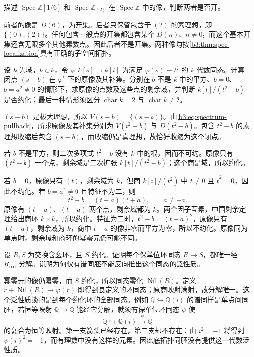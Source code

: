 \begin{exercise}\label{b3:ex:01-two-localizations}
	描述 \(\operatorname{Spec}\mathbb Z[1/6]\) 和 \(\operatorname{Spec}\mathbb Z_{(2)}\) 在 \(\operatorname{Spec}\mathbb Z\) 中的像，判断两者是否开。
\end{exercise}
\begin{solution}
	前者的像是 \(D(6)\)，为开集。后者只保留包含于 \((2)\) 的素理想，即 \(\bigl\{(0),(2)\bigr\}\)。任何包含一般点的开集都包含某个 \(D(n)\)、\(n\ne0\)，而这个基本开集还含无限多个其他素数点。因此后者不是开集。两种像均按\cref{b3:thm:spec-localization}具有正确的子空间拓扑。
\end{solution}

\begin{exercise}\label{b3:ex:01-square-map}
	设 \(k\) 为域，\(b\in k\)，令 \(\varphi:k[s]\rightarrow k[t]\) 为满足 \(\varphi(s)=t^2\) 的 \(k\)-代数同态。计算闭点 \((s-b)\) 在 \(\varphi^*\) 下的原像及其补集。分别在 \(b\) 不是 \(k\) 中的平方、\(b=0\)、\(b=a^2\ne0\) 的情形下，求原像的点数及这些点的剩余域，并判断 \(k[t]/(t^2-b)\) 是否约化；最后一种情形须区分 \(\operatorname{char}k=2\) 与 \(\operatorname{char}k\ne2\)。
\end{exercise}
\begin{solution}
	\((s-b)\) 是极大理想，所以 \(V(s-b)=\{(s-b)\}\)。由\eqref{b3:eq:spectrum-pullback}，所求原像及其补集分别为 \(V(t^2-b)\) 与 \(D(t^2-b)\)。包含 \(t^2-b\) 的素理想收缩后包含 \((s-b)\)，而收缩仍是真理想，故恰好收缩为这个闭点。

	若 \(b\) 不是平方，则二次多项式 \(t^2-b\) 没有 \(k\) 中的根，因而不可约。原像只有 \((t^2-b)\) 一个点，剩余域是二次扩张 \(k[t]/(t^2-b)\)；这个商是域，所以约化。

	若 \(b=0\)，原像只有 \((t)\)，剩余域为 \(k\)，但商 \(k[t]/(t^2)\) 中 \(\bar t\ne0\) 且 \(\bar t^2=0\)，因此不约化。若 \(b=a^2\ne0\) 且特征不为二，则
	\[
		t^2-b=(t-a)(t+a),\qquad a\ne-a.
	\]
	原像有 \((t-a)\)、\((t+a)\) 两个点，剩余域都为 \(k\)。两个因子互素，中国剩余定理给出商环 \(k\times k\)，所以约化。特征为二时，\(t^2-b=(t-a)^2\)，原像只有 \((t-a)\)，剩余域为 \(k\)，商中 \(t-a\) 的像非零而平方为零，所以不约化。原像同为单点时，剩余域和商环的幂零元仍可能不同。
\end{solution}

\begin{exercise}\label{b3:ex:01-reduction-universal}
	设 \(R,S\) 为交换含幺环，且 \(S\) 约化。证明每个保单位环同态 \(R\rightarrow S\)，都唯一经 \(R_{\mathrm{red}}\) 分解。说明为何仅有谱同胚不能反向推出这个同态的泛性质。
\end{exercise}
\begin{solution}
	幂零元的像仍幂零，而 \(S\) 约化，所以同态零化 \(\operatorname{Nil}(R)\)。定义 \(r+\operatorname{Nil}(R)\mapsto\varphi(r)\) 即得到良定义的环同态；原商映射满射，故分解唯一。这个泛性质谈的是到每个约化环的全部同态。例如 \(\mathbb Q\hookrightarrow\mathbb Q(i)\) 的谱同样是单点间同胚，若恒等映射 \(\mathbb Q\rightarrow\mathbb Q\) 能经它分解，就须有保单位环同态 \(\psi\) 使
	\[
		\mathbb Q\hookrightarrow\mathbb Q(i)\xrightarrow{\psi}\mathbb Q
	\]
	的复合为恒等映射。第一支箭头已经存在，第二支却不存在：由 \(i^2=-1\) 将得到 \(\psi(i)^2=-1\)，而有理数中没有这样的元素。因此底拓扑同胚没有提供这一代数泛性质。
\end{solution}

